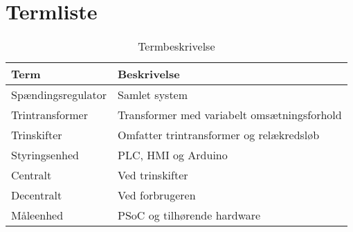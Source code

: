 

\chapter{Termliste}

\begin{table}[htbp]
	\centering
	\begin{tabular}{|l|l|}
		\hline
		\textbf{Term} 	& \textbf{Beskrivelse} \\\hline
		Spændingsregulator	& Samlet system \\\hline
		Trintransformer	& Transformer med variabelt omsætningsforhold \\\hline
		Trinskifter	& Omfatter trintransformer og relækredsløb  \\\hline
		Styringsenhed	& PLC, HMI og Arduino \\\hline
		Centralt	& Ved trinskifter \\\hline
		Decentralt 	& Ved forbrugeren \\\hline
		Måleenhed	& PSoC og tilhørende hardware \\\hline
		
	\end{tabular}
	\caption{Termbeskrivelse}
	\label{tab:termbeskrivelsen}
	
\end{table}